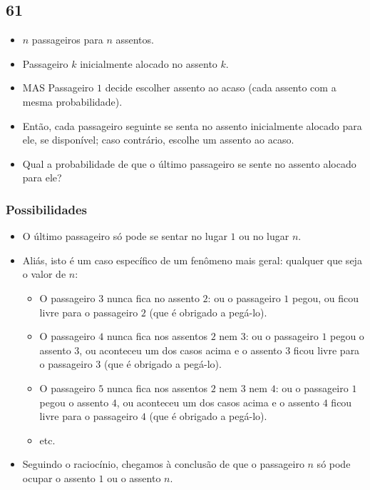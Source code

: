 \documentclass[
  11pt]{report}
\begin{document}
\hypertarget{section-6}{%
\subsection*{61}\label{section-6}}

\begin{rmdbox}

\begin{itemize}
\item
  $n$ passageiros para $n$ assentos.
\item
  Passageiro $k$ inicialmente alocado no assento $k$.
\item
  MAS Passageiro $1$ decide escolher assento ao acaso (cada assento com a mesma probabilidade).
\item
  Então, cada passageiro seguinte se senta no assento inicialmente alocado para ele, se disponível; caso contrário, escolhe um assento ao acaso.
\item
  Qual a probabilidade de que o último passageiro se sente no assento alocado para ele?
\end{itemize}

\end{rmdbox}

\hypertarget{possibilidades}{%
\subsubsection*{Possibilidades}\label{possibilidades}}

\begin{itemize}
\item
  O último passageiro só pode se sentar no lugar $1$ ou no lugar $n$.
\item
  Aliás, isto é um caso específico de um fenômeno mais geral: qualquer que seja o valor de $n$:

  \begin{itemize}
  \item
    O passageiro $3$ nunca fica no assento $2$: ou o passageiro $1$ pegou, ou ficou livre para o passageiro $2$ (que é obrigado a pegá-lo).
  \item
    O passageiro $4$ nunca fica nos assentos $2$ nem $3$: ou o passageiro $1$ pegou o assento $3$, ou aconteceu um dos casos acima e o assento $3$ ficou livre para o passageiro $3$ (que é obrigado a pegá-lo).
  \item
    O passageiro $5$ nunca fica nos assentos $2$ nem $3$ nem $4$: ou o passageiro $1$ pegou o assento $4$, ou aconteceu um dos casos acima e o assento $4$ ficou livre para o passageiro $4$ (que é obrigado a pegá-lo).
  \item
    etc.
  \end{itemize}
\item
  Seguindo o raciocínio, chegamos à conclusão de que o passageiro $n$ só pode ocupar o assento $1$ ou o assento $n$.
\end{itemize}
\end{document}
